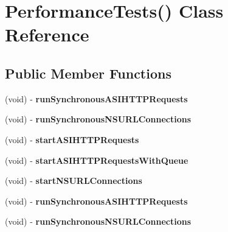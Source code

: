 \hypertarget{interface_performance_tests_07_08}{
\section{\-Performance\-Tests() \-Class \-Reference}
\label{interface_performance_tests_07_08}
}
\subsection*{\-Public \-Member \-Functions}
\begin{DoxyCompactItemize}
\item 
\hypertarget{interface_performance_tests_07_08_aa4bd4b6cb7f0a20ce794008a259d74e8}{
(void) -\/ {\bfseries run\-Synchronous\-A\-S\-I\-H\-T\-T\-P\-Requests}}
\label{interface_performance_tests_07_08_aa4bd4b6cb7f0a20ce794008a259d74e8}

\item 
\hypertarget{interface_performance_tests_07_08_a3be822f2dcb25b8359ac8d80ad4fdab1}{
(void) -\/ {\bfseries run\-Synchronous\-N\-S\-U\-R\-L\-Connections}}
\label{interface_performance_tests_07_08_a3be822f2dcb25b8359ac8d80ad4fdab1}

\item 
\hypertarget{interface_performance_tests_07_08_a85831308b2664e161d827eb680ac0ec1}{
(void) -\/ {\bfseries start\-A\-S\-I\-H\-T\-T\-P\-Requests}}
\label{interface_performance_tests_07_08_a85831308b2664e161d827eb680ac0ec1}

\item 
\hypertarget{interface_performance_tests_07_08_a251f4278545ef5f1d3ce92044d65e488}{
(void) -\/ {\bfseries start\-A\-S\-I\-H\-T\-T\-P\-Requests\-With\-Queue}}
\label{interface_performance_tests_07_08_a251f4278545ef5f1d3ce92044d65e488}

\item 
\hypertarget{interface_performance_tests_07_08_a75df8f1048ddfadaebe235787a4ba1ac}{
(void) -\/ {\bfseries start\-N\-S\-U\-R\-L\-Connections}}
\label{interface_performance_tests_07_08_a75df8f1048ddfadaebe235787a4ba1ac}

\item 
\hypertarget{interface_performance_tests_07_08_aa4bd4b6cb7f0a20ce794008a259d74e8}{
(void) -\/ {\bfseries run\-Synchronous\-A\-S\-I\-H\-T\-T\-P\-Requests}}
\label{interface_performance_tests_07_08_aa4bd4b6cb7f0a20ce794008a259d74e8}

\item 
\hypertarget{interface_performance_tests_07_08_a3be822f2dcb25b8359ac8d80ad4fdab1}{
(void) -\/ {\bfseries run\-Synchronous\-N\-S\-U\-R\-L\-Connections}}
\label{interface_performance_tests_07_08_a3be822f2dcb25b8359ac8d80ad4fdab1}


\end{DoxyCompactItemize}
